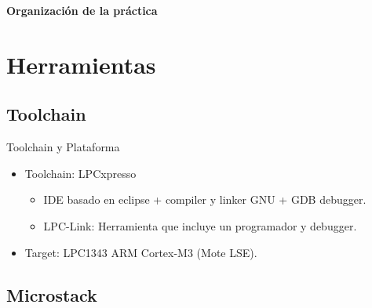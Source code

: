 \documentclass[aspectratio=169,handout]{beamer}
\begin{document}

\begin{frame}{\textbf{Organización de la práctica}}
  \tableofcontents
\end{frame}
%
%
\section[Herramientas]{Herramientas}

\subsection{Toolchain}

\begin{frame}[t]{Toolchain y Plataforma}
\vspace{10px}
    \begin{itemize}
        \item Toolchain: LPCxpresso
        \vspace{20px}
            \begin{itemize}
            \item IDE basado en eclipse + compiler y linker GNU + GDB debugger.
            \vspace{10px}
            \item LPC-Link: Herramienta que incluye un programador y debugger.
            \vspace{10px}   
            \end{itemize}
        \vspace{20px}
        \item Target: LPC1343 ARM Cortex-M3 (Mote LSE).
	\end{itemize}
\end{frame}

\subsection{Microstack}
\end{document}
